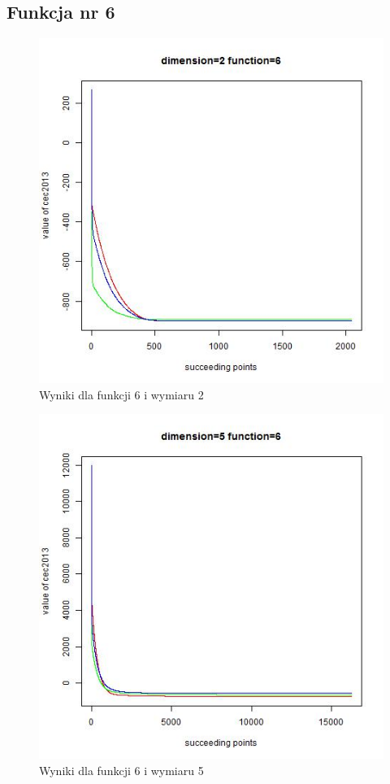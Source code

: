 \documentclass{article}
\begin{document}
\subsection{Funkcja nr 6}


\begin{figure}[H]
\centering
\includegraphics[scale=0.6]{dim_2__func_6}
\caption{Wyniki dla funkcji 6 i wymiaru 2}
\end{figure}

\begin{figure}[H]
\centering
\includegraphics[scale=0.6]{dim_5__func_6}
\caption{Wyniki dla funkcji 6 i wymiaru 5}
\end{figure}
\end{document}
